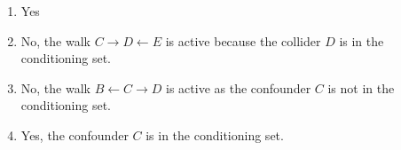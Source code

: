 \begin{enumerate}[label=5.\arabic*]
    \begin{ungradedsolution}
        \begin{enumerate}
            \item Yes
            \item No, the walk $C\rightarrow D \leftarrow E$ is active because the collider $D$ is in the conditioning set.
            \item No, the walk $B\leftarrow C \to D$ is active as the confounder $C$ is not in the conditioning set.
            \item Yes, the confounder $C$ is in the conditioning set.
        \end{enumerate}
    \end{ungradedsolution}


\end{enumerate}
